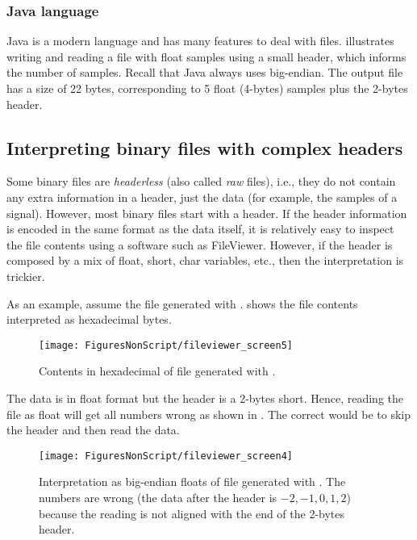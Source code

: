 \subsubsection{Java language}

Java is a modern language and has many features to deal with files.  illustrates writing and reading a file with float samples using a small header, which informs the number of samples. Recall that Java always uses big-endian. The output file has a size of 22 bytes, corresponding to 5 float (4-bytes) samples plus the 2-bytes header.



\subsection{Interpreting binary files with complex headers}
\label{app:fileHeaders}

Some binary files are \emph{headerless} (also called \emph{raw} files), i.e., they do not contain any extra information in a header, just the data (for example, the samples of a signal). However, most binary files start with a header. If the header information is encoded in the same format as the data itself, it is relatively easy to inspect the file contents using a software such as FileViewer. However, if the header is composed by a mix of float, short, char variables, etc., then the interpretation is trickier.

As an example, assume the file  generated with . 
 shows the  file contents interpreted as hexadecimal bytes. 

\begin{figure}
	\centering
		\texttt{[image: FiguresNonScript/fileviewer\_screen5]}		
	\caption{Contents in hexadecimal of file  generated with .\label{fig:fileviewer_screen5}}
\end{figure}

The data is in float format but the header is a 2-bytes short. Hence, reading the file as float will get all numbers wrong as shown in . The correct would be to skip the header and then read the data. 

\begin{figure}
	\centering
		\texttt{[image: FiguresNonScript/fileviewer\_screen4]}		
	\caption[{Interpretation as big-endian floats of file  generated with .}]{Interpretation as big-endian floats of file  generated with . The numbers are wrong (the data after the header is $-2,-1,0,1,2$) because the reading is not aligned with the end of the 2-bytes header.\label{fig:fileviewer_screen4}}
\end{figure}

